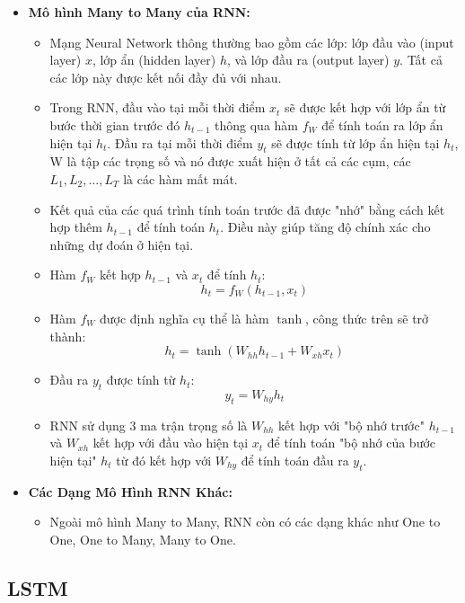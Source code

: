 \documentclass{ieeeojies}
\begin{document}
\begin{itemize}  
    \item \textbf{Mô hình Many to Many của RNN:}
    \begin{itemize}
        \item Mạng Neural Network thông thường bao gồm các lớp: lớp đầu vào (input layer) \( x \), lớp ẩn (hidden layer) \( h \), và lớp đầu ra (output layer) \( y \). Tất cả các lớp này được kết nối đầy đủ với nhau.
        \item Trong RNN, đầu vào tại mỗi thời điểm \( x_t \) sẽ được kết hợp với lớp ẩn từ bước thời gian trước đó \( h_{t-1} \) thông qua hàm \( f_W \) để tính toán ra lớp ẩn hiện tại \( h_t \). Đầu ra tại mỗi thời điểm \( y_t \) sẽ được tính từ lớp ẩn hiện tại \( h_t \), W là tập các trọng số và nó được xuất hiện ở tất cả các cụm, các \( L_1, L_2, \ldots, L_T \) là các hàm mất mát.
        \item Kết quả của các quá trình tính toán trước đã được "nhớ" bằng cách kết hợp thêm \( h_{t-1} \) để tính toán \( h_t \). Điều này giúp tăng độ chính xác cho những dự đoán ở hiện tại.
        \item Hàm \( f_W \) kết hợp \( h_{t-1} \) và \( x_t \) để tính \( h_t \):
        \[
        h_t = f_W(h_{t-1}, x_t)
        \]
        \item Hàm \( f_W \) được định nghĩa cụ thể là hàm \( \tanh \), công thức trên sẽ trở thành:
        \[
        h_t = \tanh(W_{hh}h_{t-1} + W_{xh}x_t)
        \]
        \item Đầu ra \( y_t \) được tính từ \( h_t \):
        \[
        y_t = W_{hy}h_t
        \]
        \item RNN sử dụng 3 ma trận trọng số là \( W_{hh} \) kết hợp với "bộ nhớ trước" \( h_{t-1} \) và \( W_{xh} \) kết hợp với đầu vào hiện tại \( x_t \) để tính toán "bộ nhớ của bước hiện tại" \( h_t \) từ đó kết hợp với \( W_{hy} \) để tính toán đầu ra \( y_t \).
    \end{itemize}
            
    \item \textbf{Các Dạng Mô Hình RNN Khác:}
    \begin{itemize}
        \item Ngoài mô hình Many to Many, RNN còn có các dạng khác như One to One, One to Many, Many to One.
    \end{itemize}
\end{itemize}

\subsection{LSTM}
\end{document}
